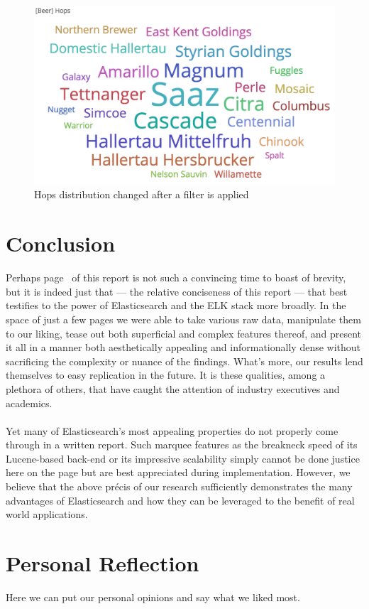 \documentclass[bibliography=totoc]{article}
\begin{document}
\begin{figure}
  \centering
  \includegraphics[width=\linewidth]{beer_hops_after.png}
 \caption{Hops distribution changed after a filter is applied}
  \label{fig:beer_hops_after}
\end{figure}

\section{Conclusion}
Perhaps page \thepage\ of this report is not such a convincing time to boast of brevity, but it is
indeed just that — the relative conciseness of this report — that best testifies to the power of Elasticsearch
and the ELK stack more broadly. In the space of just a few pages we were able to take various raw data,
manipulate them to our liking, tease out both superficial and complex features thereof, and present it all in
a manner both aesthetically appealing and informationally dense without sacrificing the complexity or nuance
of the findings. What's more, our results lend themselves to easy replication in the future. It is these
qualities, among a plethora of others, that have caught the attention of industry executives and academics.
\\
\\
Yet many of Elasticsearch's most appealing properties do not properly come through in a written report.
Such marquee features as the breakneck speed of its Lucene-based back-end or its impressive scalability
simply cannot be done justice here on the page but are best appreciated during implementation. However, we
believe that the above précis of our research sufficiently demonstrates the many advantages of Elasticsearch
and how they can be leveraged to the benefit of real world applications.

\section{Personal Reflection}
Here we can put our personal opinions and say what we liked most.
\end{document}
